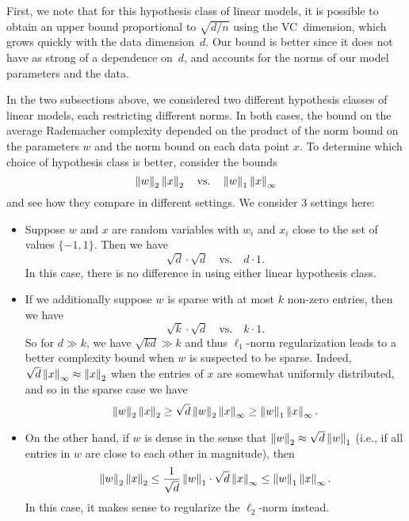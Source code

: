 
First, we note that for this hypothesis class of linear models, it is possible to obtain an upper bound proportional to $\sqrt{d/n}$ using the VC~dimension, which grows quickly with the data dimension~$d$. Our bound is better since it does not have as strong of a dependence on~$d$, and accounts for the norms of our model parameters and the data.

In the two subsections above, we considered two different hypothesis classes of linear models, each restricting different norms. In both cases, the bound on the average Rademacher complexity depended on the product of the norm bound on the parameters $w$ and the norm bound on each data point $x$. To determine which choice of hypothesis class is better, consider the bounds
    \begin{equation*}
        \left\|w\right\|_2\left\|x\right\|_2 \quad\text{vs.}\quad \left\|w\right\|_1\left\|x\right\|_\infty
    \end{equation*}
    and see how they compare in different settings. We consider 3 settings here:
    
    \begin{itemize}
    \item Suppose $w$ and $x$ are random variables with $w_i$ and $x_i$ close to the set of values $\{-1,1\}$. Then we have
    \begin{equation*}
        \sqrt{d}\cdot \sqrt{d} \quad\text{vs.}\quad d\cdot 1.
    \end{equation*}
    In this case, there is no difference in using either linear hypothesis class.
    
    \item If we additionally suppose $w$ is sparse with at most $k$ non-zero entries, then we have
    \begin{equation*}
        \sqrt{k}\cdot\sqrt{d} \quad\text{vs.}\quad k\cdot 1.
    \end{equation*}
    So for $d \gg k$, we have $\sqrt{kd} \gg k$ and thus $\ell_1$-norm regularization leads to a better complexity bound when $w$ is suspected to be sparse. Indeed, $\sqrt{d}\left\|x\right\|_\infty \approx \left\|x\right\|_2$ when the entries of $x$ are somewhat uniformly distributed, and so in the sparse case we have
    \begin{equation}
        \left\|w\right\|_2\left\|x\right\|_2 \geq \sqrt{d}\left\|w\right\|_2\left\|x\right\|_\infty \geq \left\|w\right\|_1\left\|x\right\|_\infty. 
    \end{equation}
    
    \item On the other hand, if $w$ is dense in the sense that $\left\|w\right\|_2\approx {\sqrt{d}}\left\|w\right\|_1$ (i.e., if all entries in $w$ are close to each other in magnitude), then
    \begin{equation}
        \left\|w\right\|_2\left\|x\right\|_2 \leq \frac{1}{\sqrt{d}}\left\|w\right\|_1 \cdot \sqrt{d} \left\|x\right\|_\infty \leq \left\|w\right\|_1\left\|x\right\|_\infty.
    \end{equation}
    In this case, it makes sense to regularize the $\ell_2$-norm instead.
    \end{itemize}
    
